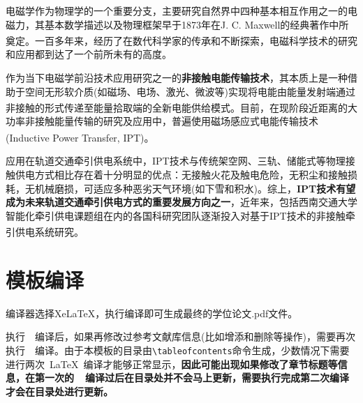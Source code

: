 \begin{framed}
	电磁学作为物理学的一个重要分支，主要研究自然界中四种基本相互作用之一的电磁力，其基本数学描述以及物理框架早于1873年在J. C. Maxwell的经典著作\cite{Maxwell1873}中所奠定。一百多年来，经历了在数代科学家的传承和不断探索\textsuperscript{\cite{Stratton1941,Cheng1989,Jackson1999,Guru2004,Kong2008,Griffiths2012,Purcell2013,Ida2015}}，电磁科学技术的研究和应用都到达了一个前所未有的高度。
	
	作为当下电磁学前沿技术应用研究之一的\textbf{非接触电能传输技术}，其本质上是一种借助于空间无形软介质(如磁场、电场、激光、微波等)实现将电能由能量发射端通过非接触的形式传递至能量拾取端的全新电能供给模式\textsuperscript{\cite{黄学良2013}}。目前，在现阶段近距离的大功率非接触能量传输的研究及应用中，普遍使用磁场感应式电能传输技术(Inductive Power Transfer, IPT)\textsuperscript{\cite{covic2013inductive}}。
	
	应用在轨道交通牵引供电系统中，IPT技术与传统架空网、三轨、储能式等物理接触供电方式相比存在着十分明显的优点：无接触火花及触电危险，无积尘和接触损耗，无机械磨损，可适应多种恶劣天气环境(如下雪和积水)。综上，\textbf{IPT技术有望成为未来轨道交通牵引供电方式的重要发展方向之一}，近年来，包括西南交通大学智能化牵引供电课题组在内的各国科研究团队逐渐投入对基于IPT技术的非接触牵引供电系统研究\textsuperscript{\cite{Buja2015,Kim2015}}。
\end{framed}

\section{模板编译}
编译器选择XeLaTeX，执行编译即可生成最终的学位论文.pdf文件。

执行~\XeLaTeX{}~编译后，如果再修改过参考文献库信息(比如增添和删除等操作)，需要再次执行~\XeLaTeX{}~编译。由于本模板的目录由\verb|\tableofcontents|命令生成，少数情况下需要进行两次~\LaTeX~编译才能够正常显示，\textbf{因此可能出现如果修改了章节标题等信息，在第一次的~\XeLaTeX{}~编译过后在目录处并不会马上更新，需要执行完成第二次编译才会在目录处进行更新。}